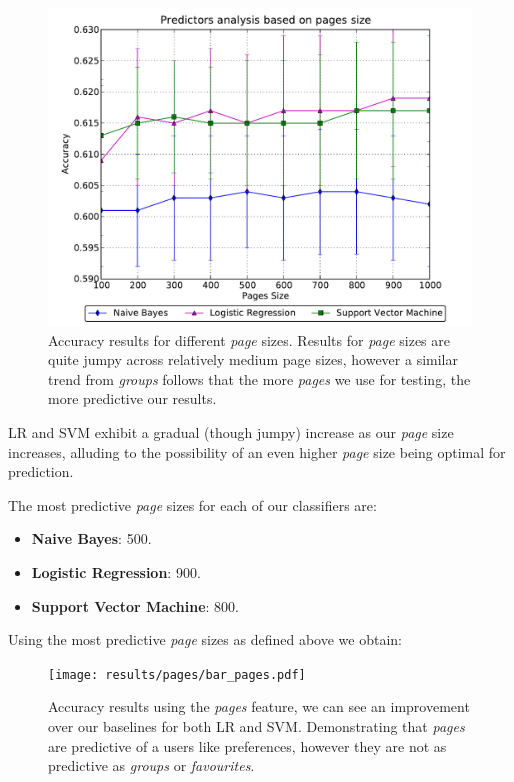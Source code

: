 \begin{figure}[h]
	\begin{center}
		\includegraphics[scale=0.75]{results/pages/top_pages.pdf}
		\caption{Accuracy results for different \emph{page} sizes. Results for \emph{page} sizes are quite jumpy across relatively medium page sizes, however a similar trend 
				 from \emph{groups} follows that the more \emph{pages} we use for testing, the more predictive our results.}
	\end{center}
\end{figure}

LR and SVM exhibit a gradual (though jumpy) increase as our \emph{page} size increases, alluding to the possibility of an even higher \emph{page}
size being optimal for prediction.

The most predictive \emph{page} sizes for each of our classifiers are:
\begin{itemize}
\item \textbf{Naive Bayes}: 500.
\item \textbf{Logistic Regression}: 900.
\item \textbf{Support Vector Machine}: 800.
\end{itemize}

\clearpage

Using the most predictive \emph{page} sizes as defined above we obtain:

\begin{figure}[h]
	\begin{center}
		\texttt{[image: results/pages/bar\_pages.pdf]}
		\caption{Accuracy results using the \emph{pages} feature, we can see an improvement over our baselines for both LR and SVM. 
				 Demonstrating that \emph{pages} are predictive of a users like preferences, however they are not as predictive as 
				 \emph{groups} or \emph{favourites}.}
	\end{center}
\end{figure}

